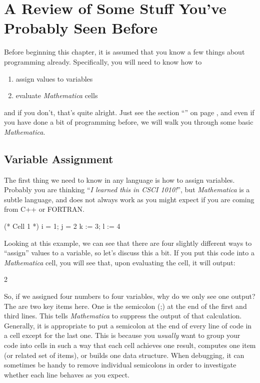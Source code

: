 \chapter[Stuff You've Seen Before]{A Review of Some Stuff You've Probably Seen Before}
\label{chap:SeenBefore}

Before beginning this chapter, it is assumed that you know a few things about programming already. Specifically, you will need to know how to
\begin{enumerate}
	   \item assign values to variables
	   \item evaluate \emph{Mathematica} cells
\end{enumerate}
and if you don't, that's quite alright. Just see the section ``\emph{}'' on page \pageref{chap:Prelim}, and even if you have done a bit of programming before, we will walk you through some basic \emph{Mathematica}.

\section{Variable Assignment}
The first thing we need to know in any language is how to assign variables. Probably you are thinking ``\emph{I learned this in CSCI 1010!}'', but \emph{Mathematica} is a subtle language, and does not always work as you might expect if you are coming from C++ or FORTRAN.

\begin{code}
	(* Cell 1 *)
	i = 1;
	j = 2
	k := 3;
	l := 4
\end{code}

Looking at this example, we can see that there are four slightly different ways to ``assign'' values to a variable, so let's discuss this a bit. If you put this code into a \emph{Mathematica} cell, you will see that, upon evaluating the cell, it will output:

\begin{code}
2
\end{code}

So, if we assigned four numbers to four variables, why do we only see one output? The are two key items here. One is the semicolon (;) at the end of the first and third lines. This tells \emph{Mathematica} to suppress the output of that calculation. Generally, it is appropriate to put a semicolon at the end of every line of code in a cell except for the last one. This is because you \emph{usually} want to group your code into cells in such a way that each cell achieves one result, computes one item (or related set of items), or builds one data structure. When debugging, it can sometimes be handy to remove individual semicolons in order to investigate whether each line behaves as you expect.

